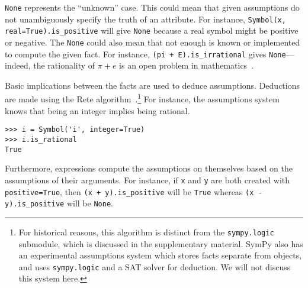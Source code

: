\texttt{None} represents the ``unknown'' case. This could mean that given
assumptions do not unambiguously specify the truth of an attribute. For
instance, \texttt{Symbol(\textquotesingle{}x\textquotesingle{},
  real=True).is\_positive} will give \texttt{None} because a real symbol might
be positive or negative. The \texttt{None} could also mean that not enough is
known or implemented to compute the given fact. For instance, \texttt{(pi +
  E).is\_irrational} gives \texttt{None}---indeed, the rationality of
$\pi + e$ is an open problem in mathematics~\cite{lang1966introduction}.

Basic implications between the facts are used to deduce assumptions.
Deductions are made using the Rete
algorithm~\cite{doorenbos1995production}.\footnote{\label{note:assumptions}For historical reasons,
  this algorithm is distinct from the \texttt{sympy.logic} submodule, which is
  discussed in the supplementary material. SymPy also has an experimental
  assumptions system which stores facts separate from objects, and uses
  \texttt{sympy.logic} and a SAT solver for deduction. We will not discuss
  this system here.} For instance, the assumptions system knows that being an
integer implies being rational.
\begin{verbatim}
>>> i = Symbol('i', integer=True)
>>> i.is_rational
True
\end{verbatim}
Furthermore, expressions compute the assumptions on themselves
based on the assumptions of their arguments. For instance, if \texttt{x} and
\texttt{y} are both created with \texttt{positive=True}, then
\texttt{(x + y).is\_positive} will be \texttt{True} whereas
\texttt{(x - y).is\_positive} will be \texttt{None}.
